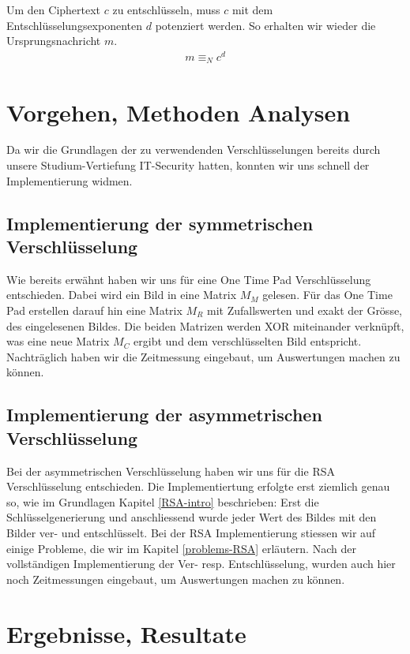 \documentclass[paper=a4,fontsize=12pt]{scrartcl}
\begin{document}
Um den Ciphertext $c$ zu entschlüsseln, muss $c$ mit dem Entschlüsselungsexponenten $d$ potenziert werden.
So erhalten wir wieder die Ursprungsnachricht $m$.
\begin{align}
	m \equiv_N c^d
\end{align}

 

\newpage
\section{Vorgehen, Methoden Analysen}
Da wir die Grundlagen der zu verwendenden Verschlüsselungen bereits durch unsere Studium-Vertiefung IT-Security hatten,
konnten wir uns schnell der Implementierung widmen.

\subsection{Implementierung der symmetrischen Verschlüsselung}
Wie bereits erwähnt haben wir uns für eine One Time Pad Verschlüsselung entschieden.
Dabei wird ein Bild in eine Matrix $M_M$ gelesen. 
Für das One Time Pad erstellen darauf hin eine Matrix $M_R$ mit Zufallswerten und exakt der Grösse, des eingelesenen Bildes.
Die beiden Matrizen werden XOR miteinander verknüpft, was eine neue Matrix $M_C$ ergibt und dem verschlüsselten Bild entspricht.
Nachträglich haben wir die Zeitmessung eingebaut, um Auswertungen machen zu können.


\subsection{Implementierung der asymmetrischen Verschlüsselung}
Bei der asymmetrischen Verschlüsselung haben wir uns für die RSA Verschlüsselung entschieden.
Die Implementiertung erfolgte erst ziemlich genau so, wie im Grundlagen Kapitel \ref{RSA-intro} beschrieben:
Erst die Schlüsselgenerierung und anschliessend wurde jeder Wert des Bildes mit den Bilder ver- und entschlüsselt.
Bei der RSA Implementierung stiessen wir auf einige Probleme, die wir im Kapitel \ref{problems-RSA} erläutern.
Nach der vollständigen Implementierung der Ver- resp. Entschlüsselung, wurden auch hier noch Zeitmessungen eingebaut, um Auswertungen
machen zu können.

\newpage
\section{Ergebnisse, Resultate} \label{results} 
\end{document}
